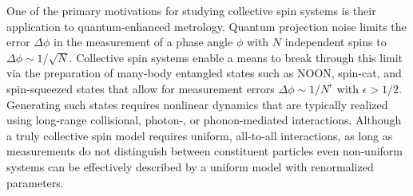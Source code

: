 \documentclass[aps,11pt,notitlepage,nofootinbib,longbibliography]{revtex4-1}
\renewcommand{\t}{\text} %
\newcommand{\z}{\text{z}}
\newcommand{\1}{\mathds{1}}
\begin{document}
One of the primary motivations for studying collective spin systems is
their application to quantum-enhanced metrology.  Quantum projection
noise limits the error $\Delta\phi$ in the measurement of a phase
angle $\phi$ with $N$ independent spins to
$\Delta\phi\sim1/\sqrt{N}$\cite{wineland1992spin, itano1993quantum,
  ma2011quantum}.  Collective spin systems enable a means to break
through this limit via the preparation of many-body entangled states
such as NOON\cite{jones2009magnetic, chen2010heralded,
  zhong2010simplified}, spin-cat\cite{huang2015quantum,
  agarwal1997atomic, lau2014proposal}, and spin-squeezed
states\cite{takano2009spin, riedel2010atomchipbased,
  gross2010nonlinear, hosten2016quantum, norcia2018cavitymediated,
  wineland1992spin, kitagawa1993squeezed, ma2011quantum} that allow
for measurement errors $\Delta\phi\sim1/N^\epsilon$ with
$\epsilon>1/2$.  Generating such states requires nonlinear dynamics
that are typically realized using long-range collisional, photon-, or
phonon-mediated interactions.
Although a truly collective spin model requires uniform, all-to-all
interactions, as long as measurements do not distinguish between
constituent particles even non-uniform systems can be effectively
described by a uniform model with renormalized
parameters\cite{hu2015entangled}.
\end{document}
